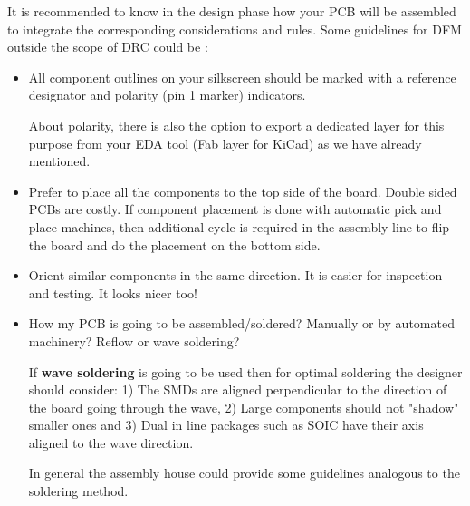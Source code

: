 \documentclass[final]{cubedoc}
\begin{document}
	It is recommended to know in the design phase how your PCB will be assembled to integrate the corresponding considerations and rules. Some guidelines for DFM outside the scope of DRC could be \cite{mitzner2011complete, ema2019hitchhiker}:
	
	\begin{itemize}
		\item All component outlines on your silkscreen should be marked with a reference designator and polarity (pin 1 marker) indicators. 
		
		About polarity, there is also the option to export a dedicated layer for this purpose from your EDA tool (Fab layer for KiCad) as we have already mentioned.
		
		\item Prefer to place all the components to the top side of the board. Double sided PCBs are costly. If component placement is done with automatic pick and place machines, then additional cycle is required in the assembly line to flip the board and do the placement on the bottom side.
		\item Orient similar components in the same direction. It is easier for inspection and testing. It looks nicer too!	
		\item How my PCB is going to be assembled/soldered? Manually or by automated machinery? Reflow or wave soldering?
		
		If \textbf{wave soldering} is going to be used then for optimal soldering the designer should consider: 1) The SMDs are aligned perpendicular to the direction of the board going through the wave, 2) Large components should not "shadow" smaller ones and 3) Dual in line packages such as SOIC have their axis aligned to the wave direction. 
		
		
		In general the assembly house could provide some guidelines analogous to the soldering method. 
		

\end{itemize}
\end{document}
